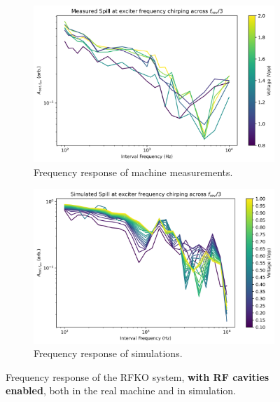 \documentclass[11pt]{report}
\begin{document}
\begin{figure}[h]
  \centering
  \begin{subfigure}[b]{0.9\linewidth}
    \includegraphics*[width=\linewidth]{machine_rf_on.png}
    \caption{Frequency response of machine measurements.}
  \end{subfigure}
  \begin{subfigure}[b]{0.9\linewidth}
    \includegraphics*[width=\linewidth]{sim_rf_on.png}
    \caption{Frequency response of simulations.}
  \end{subfigure}
  \caption{Frequency response of the RFKO system, \textbf{with RF cavities enabled}, both in the real machine and in simulation.}\label{fig:rf_on}
\end{figure}
\end{document}
